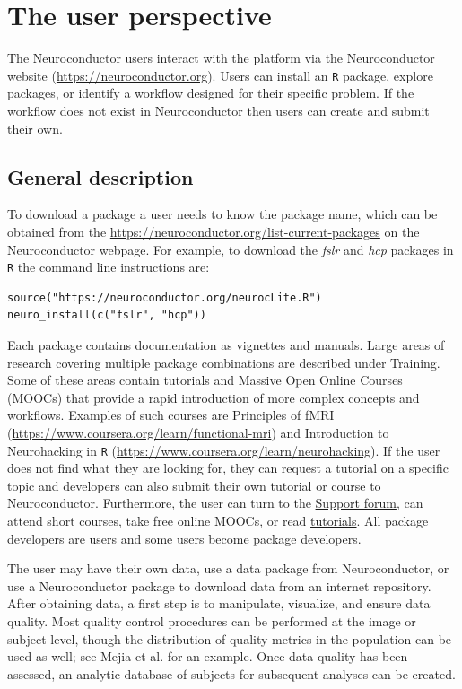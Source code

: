 \documentclass[]{elsarticle} %
\newcommand{\pkg}[1]{\emph{#1}}
\newcommand{\rlang}{\texttt{R}}
\begin{document}
\section{The user perspective}\label{section:user_perspective}
The Neuroconductor users interact with the platform via the Neuroconductor website (\url{https://neuroconductor.org}). Users can install an {\rlang} package, explore packages, or identify a workflow designed for their specific problem. If the workflow does not exist in Neuroconductor then users can create and submit their own. 


\subsection{General description}\label{subsec:general_description}
To download a package a user needs to know the package name, which can be obtained from the \href{list of packages}{https://neuroconductor.org/list-current-packages} on the Neuroconductor webpage. For example, to download the \pkg{fslr} and \pkg{hcp} packages in {\rlang} the command line instructions are: 

\color{blue}
\begin{verbatim}
source("https://neuroconductor.org/neurocLite.R") 
neuro_install(c("fslr", "hcp"))
\end{verbatim}
\color{black}

Each package contains documentation as vignettes and manuals. Large areas of research covering multiple package combinations are described under Training. Some of these areas contain tutorials and Massive  Open Online Courses (MOOCs) that provide a rapid introduction of more complex concepts and workflows. Examples of such courses are Principles of fMRI  (\url{https://www.coursera.org/learn/functional-mri}) and Introduction to Neurohacking in {\rlang} (\url{https://www.coursera.org/learn/neurohacking}).  If the user does not find what they are looking for, they can request a tutorial on a specific topic and developers can also submit their own tutorial or course to Neuroconductor. Furthermore, the user can turn to the \href{https://neuroconductor.org/forum}{Support forum},  can attend short courses, take free online MOOCs, or read \href{https://neuroconductor.org/neuroc-help}{tutorials}. All package developers are users and some users become package developers.

The user may have their own data, use a data package from Neuroconductor, or use a Neuroconductor package  to download data from an internet repository.  
After obtaining data, a first step is to manipulate, visualize, and ensure data quality.  Most quality control procedures can be performed at the image or subject level, though the distribution of quality metrics in the population can be used as well; see Mejia et al. \citep{mejia2015pca} for an example. Once data quality has been assessed, an analytic database of subjects for subsequent analyses can be created.   
\end{document}

